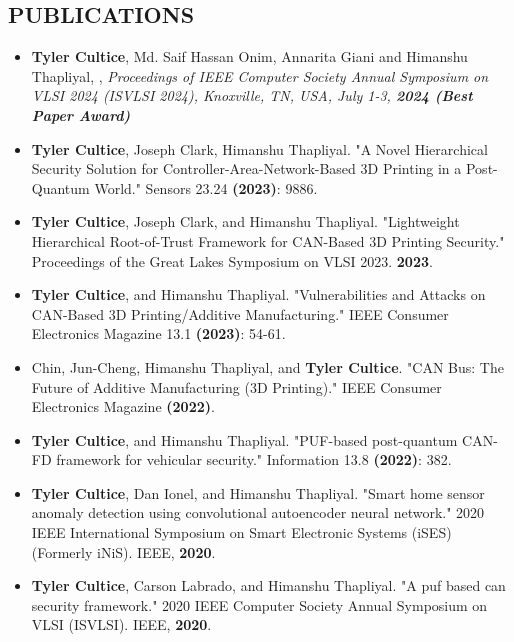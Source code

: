 \documentclass[line,margin,9pt]{res}
\begin{document}
\begin{resume}
\section{PUBLICATIONS}
\begin{itemize}

\item\textbf{Tyler Cultice}, Md. Saif Hassan Onim, Annarita Giani and Himanshu Thapliyal, , \textit{Proceedings of IEEE Computer Society Annual Symposium on VLSI 2024 (ISVLSI 2024), Knoxville, TN, USA, July 1-3, \textbf{2024 (Best Paper Award)}}

\item \textbf{Tyler Cultice}, Joseph Clark, Himanshu Thapliyal. "A Novel Hierarchical Security Solution for Controller-Area-Network-Based 3D Printing in a Post-Quantum World." Sensors 23.24 \textbf{(2023)}: 9886.

\item \textbf{Tyler Cultice}, Joseph Clark, and Himanshu Thapliyal. "Lightweight Hierarchical Root-of-Trust Framework for CAN-Based 3D Printing Security." Proceedings of the Great Lakes Symposium on VLSI 2023. \textbf{2023}.

\item \textbf{Tyler Cultice}, and Himanshu Thapliyal. "Vulnerabilities and Attacks on CAN-Based 3D Printing/Additive Manufacturing." IEEE Consumer Electronics Magazine 13.1 \textbf{(2023)}: 54-61.

\item Chin, Jun-Cheng, Himanshu Thapliyal, and \textbf{Tyler Cultice}. "CAN Bus: The Future of Additive Manufacturing (3D Printing)." IEEE Consumer Electronics Magazine \textbf{(2022)}.

\item \textbf{Tyler Cultice}, and Himanshu Thapliyal. "PUF-based post-quantum CAN-FD framework for vehicular security." Information 13.8 \textbf{(2022)}: 382.

\item \textbf{Tyler Cultice}, Dan Ionel, and Himanshu Thapliyal. "Smart home sensor anomaly detection using convolutional autoencoder neural network." 2020 IEEE International Symposium on Smart Electronic Systems (iSES)(Formerly iNiS). IEEE, \textbf{2020}.

\item \textbf{Tyler Cultice}, Carson Labrado, and Himanshu Thapliyal. "A puf based can security framework." 2020 IEEE Computer Society Annual Symposium on VLSI (ISVLSI). IEEE, \textbf{2020}.


\end{itemize}
\end{resume}
\end{document}
